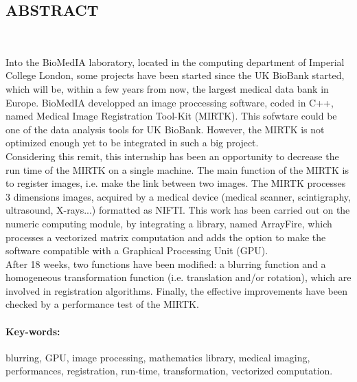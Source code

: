 \documentclass[10pt]{report}
\begin{document}
\subsection*{ABSTRACT}
~\par
Into the BioMedIA laboratory, located in the computing department of Imperial College London, some projects have been started since the UK BioBank started, which will be, within a few years from now, the largest medical data bank in Europe. BioMedIA developped an image proccessing software, coded in C++, named Medical Image Registration Tool-Kit (MIRTK). This sofwtare could be one of the data analysis tools for UK BioBank. However, the MIRTK is not optimized enough yet to be integrated in such a big project.\\
Considering this remit, this internship has been an opportunity to decrease the run time of the MIRTK on a single machine. The main function of the MIRTK is to register images, i.e. make the link between two images. The MIRTK processes 3 dimensions images, acquired by a medical device (medical scanner, scintigraphy, ultrasound, X-rays...) formatted as NIFTI. This work has been carried out on the numeric computing module, by integrating a library, named ArrayFire, which processes a vectorized matrix computation and adds the option to make the software compatible with a Graphical Processing Unit (GPU).\\
After 18 weeks, two functions have been modified: a blurring function and a homogeneous transformation function (i.e. translation and/or rotation), which are involved in registration algorithms. Finally, the effective improvements have been checked by a performance test of the MIRTK. 	

\paragraph*{Key-words:} blurring, GPU, image processing, mathematics library, medical imaging, performances, registration, run-time, transformation, vectorized computation.

\renewcommand\contentsname{Sommaire}
\tableofcontents

\newpage
\end{document}
